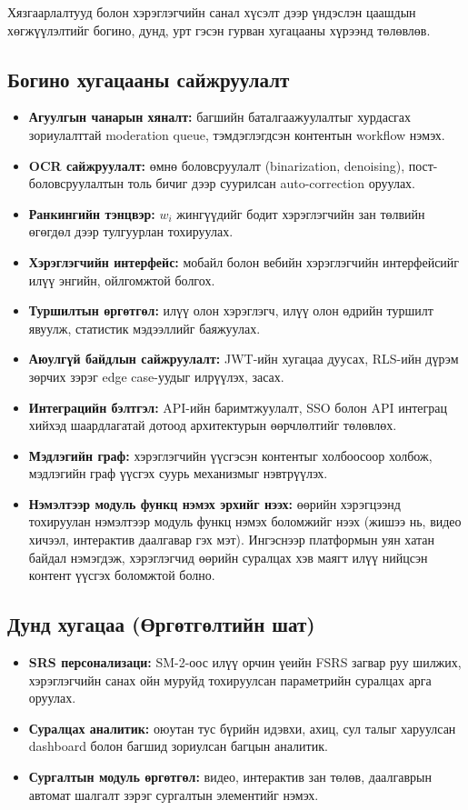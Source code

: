 Хязгаарлалтууд болон хэрэглэгчийн санал хүсэлт дээр үндэслэн цаашдын хөгжүүлэлтийг богино, дунд, урт гэсэн гурван хугацааны хүрээнд төлөвлөв.

\subsection{Богино хугацааны сайжруулалт}
\begin{itemize}[leftmargin=2em]
    \item \textbf{Агуулгын чанарын хяналт:} багшийн баталгаажуулалтыг хурдасгах зориулалттай moderation queue, тэмдэглэгдсэн контентын workflow нэмэх.
    \item \textbf{OCR сайжруулалт:} өмнө боловсруулалт (binarization, denoising), пост-боловсруулалтын толь бичиг дээр суурилсан auto-correction оруулах.
    \item \textbf{Ранкингийн тэнцвэр:} $w_i$ жингүүдийг бодит хэрэглэгчийн зан төлвийн өгөгдөл дээр тулгуурлан тохируулах.
    \item \textbf{Хэрэглэгчийн интерфейс:} мобайл болон вебийн хэрэглэгчийн интерфейсийг илүү энгийн, ойлгомжтой болгох.
    \item \textbf{Туршилтын өргөтгөл:} илүү олон хэрэглэгч, илүү олон өдрийн туршилт явуулж, статистик мэдээллийг баяжуулах.
    \item \textbf{Аюулгүй байдлын сайжруулалт:} JWT-ийн хугацаа дуусах, RLS-ийн дүрэм зөрчих зэрэг edge case-уудыг илрүүлэх, засах.
    \item \textbf{Интеграцийн бэлтгэл:} API-ийн баримтжуулалт, SSO болон API интеграц хийхэд шаардлагатай дотоод архитектурын өөрчлөлтийг төлөвлөх.
    \item \textbf{Мэдлэгийн граф:} хэрэглэгчийн үүсгэсэн контентыг холбоосоор холбож, мэдлэгийн граф үүсгэх суурь механизмыг нэвтрүүлэх.
    \item \textbf{Нэмэлтээр модуль функц нэмэх эрхийг нээх:} өөрийн хэрэгцээнд тохируулан нэмэлтээр модуль функц нэмэх боломжийг нээх (жишээ нь, видео хичээл, интерактив даалгавар гэх мэт). Ингэснээр платформын уян хатан байдал нэмэгдэж, хэрэглэгчид өөрийн суралцах хэв маягт илүү нийцсэн контент үүсгэх боломжтой болно.
\end{itemize}

\subsection{Дунд хугацаа (Өргөтгөлтийн шат)}
\begin{itemize}[leftmargin=2em]
    \item \textbf{SRS персонализаци:} SM-2-оос илүү орчин үеийн FSRS загвар руу шилжих, хэрэглэгчийн санах ойн муруйд тохируулсан параметрийн суралцах арга оруулах.
    \item \textbf{Суралцах аналитик:} оюутан тус бүрийн идэвхи, ахиц, сул талыг харуулсан dashboard болон багшид зориулсан багцын аналитик.
    \item \textbf{Сургалтын модуль өргөтгөл:} видео, интерактив зан төлөв, даалгаврын автомат шалгалт зэрэг сургалтын элементийг нэмэх.
\end{itemize}

